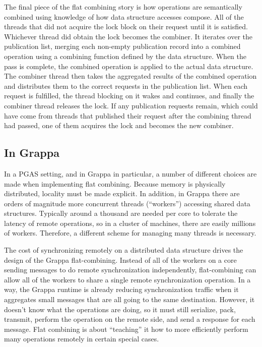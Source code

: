 The final piece of the flat combining story is how operations are semantically combined using knowledge of how data structure accesses compose. All of the threads that did not acquire the lock block on their request until it is satisfied. Whichever thread did obtain the lock becomes the combiner. It iterates over the publication list, merging each non-empty publication record into a combined operation using a combining function defined by the data structure. When the pass is complete, the combined operation is applied to the actual data structure. The combiner thread then takes the aggregated results of the combined operation and distributes them to the correct requests in the publication list. When each request is fulfilled, the thread blocking on it wakes and continues, and finally the combiner thread releases the lock. If any publication requests remain, which could have come from threads that published their request after the combining thread had passed, one of them acquires the lock and becomes the new combiner.


\subsection{In Grappa}

In a PGAS setting, and in Grappa in particular, a number of different choices are made when implementing flat combining. Because memory is physically distributed, locality must be made explicit. In addition, in Grappa there are orders of magnitude more concurrent threads (``workers'') accessing shared data structures. Typically around a thousand are needed per core to tolerate the latency of remote operations, so in a cluster of machines, there are easily millions of workers. Therefore, a different scheme for managing many threads is necessary.

The cost of synchronizing remotely on a distributed data structure drives the design of the Grappa flat-combining. Instead of all of the workers on a core sending messages to do remote synchronization independently, flat-combining can allow all of the workers to share a single remote synchronization operation. In a way, the Grappa runtime is already reducing synchronization traffic when it aggregates small messages that are all going to the same destination. However, it doesn't know what the operations are doing, so it must still serialize, pack, transmit, perform the operation on the remote side, and send a response for each message. Flat combining is about ``teaching'' it how to more efficiently perform many operations remotely in certain special cases.

